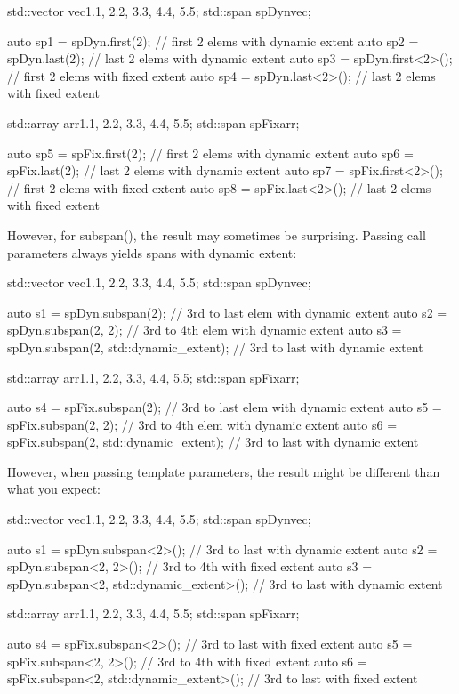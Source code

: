 \begin{cpp}
std::vector vec{1.1, 2.2, 3.3, 4.4, 5.5};
std::span spDyn{vec};

auto sp1 = spDyn.first(2); // first 2 elems with dynamic extent
auto sp2 = spDyn.last(2); // last 2 elems with dynamic extent
auto sp3 = spDyn.first<2>(); // first 2 elems with fixed extent
auto sp4 = spDyn.last<2>(); // last 2 elems with fixed extent

std::array arr{1.1, 2.2, 3.3, 4.4, 5.5};
std::span spFix{arr};

auto sp5 = spFix.first(2); // first 2 elems with dynamic extent
auto sp6 = spFix.last(2); // last 2 elems with dynamic extent
auto sp7 = spFix.first<2>(); // first 2 elems with fixed extent
auto sp8 = spFix.last<2>(); // last 2 elems with fixed extent
\end{cpp}

However, for subspan(), the result may sometimes be surprising. Passing call parameters always yields spans with dynamic extent:

\begin{cpp}
std::vector vec{1.1, 2.2, 3.3, 4.4, 5.5};
std::span spDyn{vec};

auto s1 = spDyn.subspan(2); // 3rd to last elem with dynamic extent
auto s2 = spDyn.subspan(2, 2); // 3rd to 4th elem with dynamic extent
auto s3 = spDyn.subspan(2, std::dynamic_extent); // 3rd to last with dynamic extent

std::array arr{1.1, 2.2, 3.3, 4.4, 5.5};
std::span spFix{arr};

auto s4 = spFix.subspan(2); // 3rd to last elem with dynamic extent
auto s5 = spFix.subspan(2, 2); // 3rd to 4th elem with dynamic extent
auto s6 = spFix.subspan(2, std::dynamic_extent); // 3rd to last with dynamic extent
\end{cpp}

However, when passing template parameters, the result might be different than what you expect:

\begin{cpp}
std::vector vec{1.1, 2.2, 3.3, 4.4, 5.5};
std::span spDyn{vec};

auto s1 = spDyn.subspan<2>(); // 3rd to last with dynamic extent
auto s2 = spDyn.subspan<2, 2>(); // 3rd to 4th with fixed extent
auto s3 = spDyn.subspan<2, std::dynamic_extent>(); // 3rd to last with dynamic extent

std::array arr{1.1, 2.2, 3.3, 4.4, 5.5};
std::span spFix{arr};

auto s4 = spFix.subspan<2>(); // 3rd to last with fixed extent
auto s5 = spFix.subspan<2, 2>(); // 3rd to 4th with fixed extent
auto s6 = spFix.subspan<2, std::dynamic_extent>(); // 3rd to last with fixed extent
\end{cpp}


